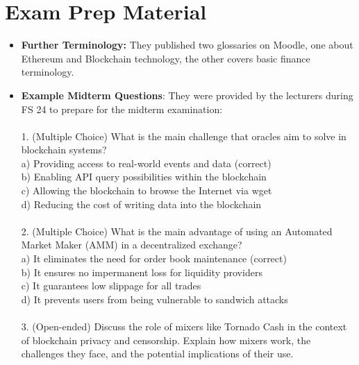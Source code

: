 \documentclass{article}
\begin{document}
\section{Exam Prep Material}
\begin{itemize}
    \item \textbf{Further Terminology: } They published two glossaries on Moodle, one about Ethereum and Blockchain technology, the other covers basic finance terminology.
    \item \textbf{Example Midterm Questions}: They were provided by the lecturers during FS 24 to prepare for the midterm examination:\\\\
    1. (Multiple Choice) What is the main challenge that oracles aim to solve in blockchain systems?\\

   a) Providing access to real-world events and data (correct)\\

   b) Enabling API query possibilities within the blockchain\\

   c) Allowing the blockchain to browse the Internet via wget\\

   d) Reducing the cost of writing data into the blockchain\\\\
2. (Multiple Choice) What is the main advantage of using an Automated Market Maker (AMM) in a decentralized exchange?\\

   a) It eliminates the need for order book maintenance (correct)\\

   b) It ensures no impermanent loss for liquidity providers\\

   c) It guarantees low slippage for all trades\\

   d) It prevents users from being vulnerable to sandwich attacks\\\\



3. (Open-ended) Discuss the role of mixers like Tornado Cash in the context of blockchain privacy and censorship. Explain how mixers work, the challenges they face, and the potential implications of their use.\\
    

\end{itemize}
\end{document}
